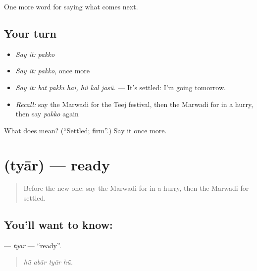 \begin{grammarlens}[title={What you've built}]
One more word for saying what comes next.
\end{grammarlens}

\subsection*{Your turn}
\begin{itemize}
\raggedright
  \item \emph{Say it:} \emph{pakko}
  \item \emph{Say it:} \emph{pakko}, once more
  \item \emph{Say it:} \emph{bāt pakkī hai, hū̃ kāl jāsū̃.} — It's settled: I'm going tomorrow.
  \item \emph{Recall:} say the Marwadi for the Teej festival, then the Marwadi for in a hurry, then say \emph{pakko} again
\end{itemize}

\begin{tcolorbox}[breakable,colback=teal!4,colframe=teal!35!black,title={Before you move on}]
What does  mean? (\textquotedblleft{}Settled; firm\textquotedblright{}.) Say it once more.
\end{tcolorbox}
\section[\texorpdfstring{\mw{त्यार} (tyār)}{त्यार (tyār)}]{ (tyār) — ready}

\label{lesson:MW-C220-tyar}



\begin{quote}
Before the new one: say the Marwadi for in a hurry, then the Marwadi for settled.
\end{quote}

\subsection*{You'll want to know: }
\textbf{} — \emph{tyār} — \textquotedblleft{}ready\textquotedblright{}.

\begin{quote}
   
\end{quote}

\begin{quote}
\emph{hū̃ abār tyār hū̃.}
\end{quote}

